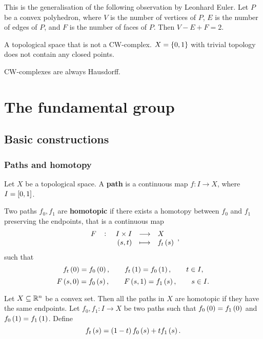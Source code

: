 This is the generalisation of the following observation by Leonhard Euler. Let $ P $ be a convex polyhedron, where $ V $ is the number of vertices of $ P $, $ E $ is the number of edges of $ P $, and $ F $ is the number of faces of $ P $. Then $ V - E + F = 2 $.

\begin{example*}
A topological space that is not a CW-complex. $ X = \cbr{0, 1} $ with trivial topology does not contain any closed points.
\end{example*}

\begin{fact*}
CW-complexes are always Hausdorff.
\end{fact*}

\pagebreak

\section{The fundamental group}

\subsection{Basic constructions}

\subsubsection{Paths and homotopy}

Let $ X $ be a topological space. A \textbf{path} is a continuous map $ f : I \to X $, where $ I = \sbr{0, 1} $.

\begin{definition*}
Two paths $ f_0, f_1 $ are \textbf{homotopic} if there exists a homotopy between $ f_0 $ and $ f_1 $ preserving the endpoints, that is a continuous map
$$ \function[F]{I \times I}{X}{\br{s, t}}{f_t\br{s}}, $$
such that
$$ f_t\br{0} = f_0\br{0}, \qquad f_t\br{1} = f_0\br{1}, \qquad t \in I, $$
$$ F\br{s, 0} = f_0\br{s}, \qquad F\br{s, 1} = f_1\br{s}, \qquad s \in I. $$
\end{definition*}

\begin{example*}
Let $ X \subseteq \mathbb{R}^n $ be a convex set. Then all the paths in $ X $ are homotopic if they have the same endpoints. Let $ f_0, f_1 : I \to X $ be two paths such that $ f_0\br{0} = f_1\br{0} $ and $ f_0\br{1} = f_1\br{1} $. Define
$$ f_t\br{s} = \br{1 - t}f_0\br{s} + tf_1\br{s}. $$
\end{example*}

